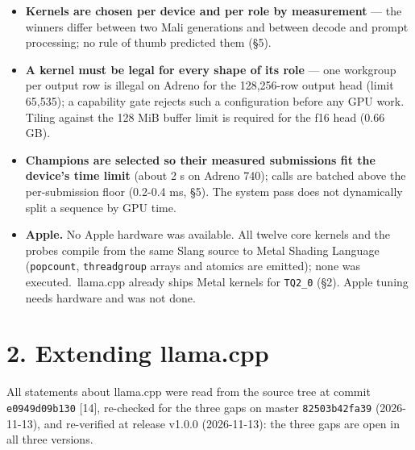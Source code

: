\documentclass[
  10pt,
]{article}
\newcounter{none} %
\providecommand{\tightlist}{%
  \setlength{\itemsep}{0pt}\setlength{\parskip}{0pt}}
\begin{document}
\begin{itemize}
\tightlist%
\item
  \textbf{Kernels are chosen per device and per role by measurement} ---
  the winners differ between two Mali generations and between decode and
  prompt processing; no rule of thumb predicted them (\S{}5).
\item
  \textbf{A kernel must be legal for every shape of its role} --- one
  workgroup per output row is illegal on Adreno for the 128,256-row
  output head (limit 65,535); a capability gate rejects such a
  configuration before any GPU work. Tiling against the 128 MiB buffer
  limit is required for the f16 head (0.66 GB).
\item
  \textbf{Champions are selected so their measured submissions fit the
  device's time limit} (about 2 s on Adreno 740); calls are batched above
  the per-submission floor (0.2-0.4 ms, \S{}5). The system pass does not
  dynamically split a sequence by GPU time.
\item
  \textbf{Apple.} No Apple hardware was available. All twelve core kernels
  and the probes compile from the same Slang source to Metal Shading
  Language (\texttt{popcount}, \texttt{threadgroup} arrays and atomics
  are emitted); none was executed.\ llama.cpp already ships Metal kernels
  for \texttt{TQ2\_0} (\S{}2). Apple tuning needs hardware and was not done.
\end{itemize}

\section{2. Extending llama.cpp}\label{extending-llama.cpp}

All statements about llama.cpp were read from the source tree at commit
\texttt{e0949d09b130} [14], re-checked for the three gaps on
master \texttt{82503b42fa39} (2026-11-13), and re-verified at release
v1.0.0 (2026-11-13): the three gaps are open in all three versions.
\end{document}
